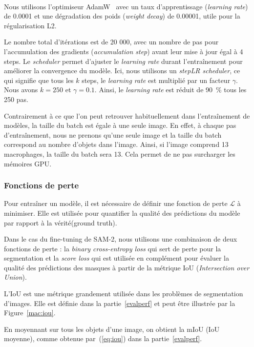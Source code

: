 \documentclass[a4paper,12pt]{report}
\newcommand{\figref}[1]{Figure~\ref{#1}}
\begin{document}
\

Nous utilisons l'optimiseur AdamW~\cite{adamw} avec un taux d'apprentissage (\textit{learning rate}) de 0.0001 et une dégradation des poids (\textit{weight decay}) de 0.00001, utile pour la régularisation L2.

Le nombre total d'itérations est de 20 000, avec un nombre de pas pour l'accumulation des gradients (\textit{accumulation step}) avant leur mise à jour égal à 4 steps. Le \textit{scheduler} permet d'ajuster le \textit{learning rate} durant l'entraînement pour améliorer la convergence du modèle. Ici, nous utilisons un \textit{stepLR scheduler}, ce qui signifie que tous les $k$ steps, le \textit{learning rate} est multiplié par un facteur $\gamma$. Nous avons $k=250$ et $\gamma=0.1$. Ainsi, le \textit{learning rate} est réduit de 90~\% tous les 250 pas.

Contrairement à ce que l'on peut retrouver habituellement dans l'entraînement de modèles, la taille du batch est égale à une seule image. En effet, à chaque pas d'entraînement, nous ne prenons qu'une seule image et la taille du batch correspond au nombre d'objets dans l'image. Ainsi, si l'image comprend 13 macrophages, la taille du batch sera 13. Cela permet de ne pas surcharger les mémoires GPU.

\subsubsection{Fonctions de perte}
Pour entraîner un modèle, il est nécessaire de définir une fonction de perte $\mathcal{L}$ à minimiser. Elle est utilisée pour quantifier la qualité des prédictions du modèle par rapport à la \og vérité\fg (ground truth).

Dans le cas du fine-tuning de SAM-2, nous utilisons une combinaison de deux fonctions de perte : la \textit{binary cross-entropy loss} qui sert de perte pour la segmentation et la \textit{score loss} qui est utilisée en complément pour évaluer la qualité des prédictions des masques à partir de la métrique IoU (\textit{Intersection over Union}).

L'IoU est une métrique grandement utilisée dans les problèmes de segmentation d'images. Elle est définie dans la partie~\ref{evalperf} et peut être illustrée par la \figref{mac:iou}.

En moyennant sur tous les objets d'une image, on obtient la mIoU (IoU moyenne), comme obtenue par~(\ref{eq:iou}) dans la partie~\ref{evalperf}.
\end{document}
